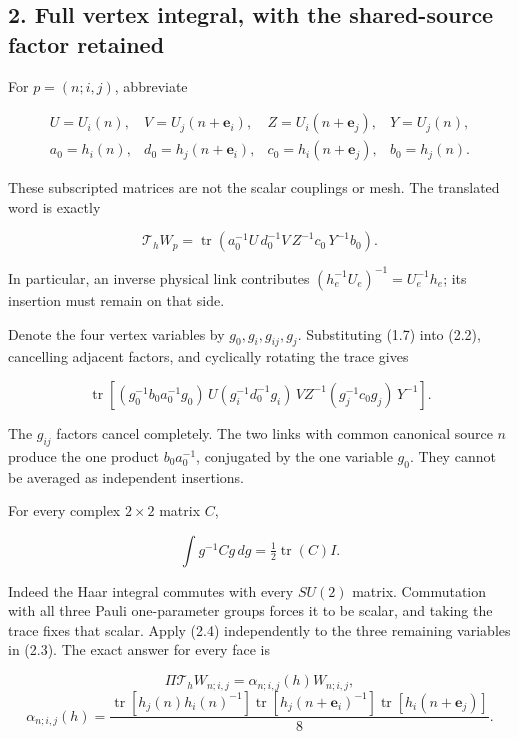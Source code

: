 \documentclass[
  11pt,
]{article}
\begin{document}
\subsection{2. Full vertex integral, with the shared-source factor
retained}\label{magnetic-part-2-full-vertex-integral-with-the-shared-source-factor-retained}

For \(p=(n;i,j)\), abbreviate

\[
\begin{array}{llll}
U=U_i(n),&V=U_j(n+\mathbf e_i),&
Z=U_i(n+\mathbf e_j),&Y=U_j(n),\\
a_0=h_i(n),&d_0=h_j(n+\mathbf e_i),&
c_0=h_i(n+\mathbf e_j),&b_0=h_j(n).
\end{array}
\tag{2.1}
\]

These subscripted matrices are not the scalar couplings or mesh. The
translated word is exactly

\[
\mathcal T_hW_p=
\operatorname{tr}(a_0^{-1}U\,d_0^{-1}V\,Z^{-1}c_0\,Y^{-1}b_0).
\tag{2.2}
\]

In particular, an inverse physical link contributes
\((h_e^{-1}U_e)^{-1}=U_e^{-1}h_e\); its insertion must remain on that
side.

Denote the four vertex variables by \(g_0,g_i,g_{ij},g_j\). Substituting
(1.7) into (2.2), cancelling adjacent factors, and cyclically rotating
the trace gives

\[
\operatorname{tr}\!\left[
(g_0^{-1}b_0a_0^{-1}g_0)\,
U(g_i^{-1}d_0^{-1}g_i)\,VZ^{-1}
(g_j^{-1}c_0g_j)\,Y^{-1}
\right].
\tag{2.3}
\]

The \(g_{ij}\) factors cancel completely. The two links with common
canonical source \(n\) produce the one product \(b_0a_0^{-1}\),
conjugated by the one variable \(g_0\). They cannot be averaged as
independent insertions.

For every complex \(2\times2\) matrix \(C\),

\[
\int g^{-1}Cg\,dg=\tfrac12\operatorname{tr}(C)I.
\tag{2.4}
\]

Indeed the Haar integral commutes with every \(SU(2)\) matrix.
Commutation with all three Pauli one-parameter groups forces it to be
scalar, and taking the trace fixes that scalar. Apply (2.4)
independently to the three remaining variables in (2.3). The exact
answer for every face is

\[
\boxed{\Pi\mathcal T_hW_{n;i,j}=\alpha_{n;i,j}(h)W_{n;i,j},}
\] \[
\boxed{\alpha_{n;i,j}(h)=
\frac{
\operatorname{tr}[h_j(n)h_i(n)^{-1}]
\operatorname{tr}[h_j(n+\mathbf e_i)^{-1}]
\operatorname{tr}[h_i(n+\mathbf e_j)]
}{8}.}
\tag{2.5}
\]
\end{document}
